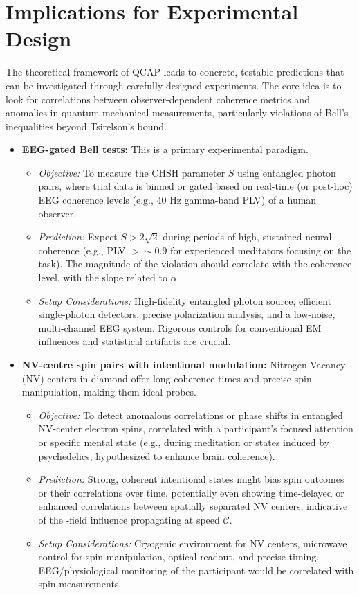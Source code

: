 \documentclass[11pt,a4paper]{article}
\newcommand{\PropSpeed}{\ensuremath{\mathscr{C}}}
\begin{document}
\section{Implications for Experimental Design}
\label{sec:experimental-design}
The theoretical framework of QCAP leads to concrete, testable predictions that can be investigated through carefully designed experiments. The core idea is to look for correlations between observer-dependent coherence metrics and anomalies in quantum mechanical measurements, particularly violations of Bell's inequalities beyond Tsirelson's bound.
\begin{itemize}
    \item \textbf{EEG-gated Bell tests:} This is a primary experimental paradigm.
    \begin{itemize}
        \item \textit{Objective:} To measure the CHSH parameter $S$ using entangled photon pairs, where trial data is binned or gated based on real-time (or post-hoc) EEG coherence levels (e.g., 40 Hz gamma-band PLV) of a human observer.
        \item \textit{Prediction:} Expect $S > 2\sqrt{2}$ during periods of high, sustained neural coherence (e.g., PLV $> \sim 0.9$ for experienced meditators focusing on the task). The magnitude of the violation should correlate with the coherence level, with the slope related to $\alpha$.
        \item \textit{Setup Considerations:} High-fidelity entangled photon source, efficient single-photon detectors, precise polarization analysis, and a low-noise, multi-channel EEG system. Rigorous controls for conventional EM influences and statistical artifacts are crucial.
    \end{itemize}

    \item \textbf{NV-centre spin pairs with intentional modulation:} Nitrogen-Vacancy (NV) centers in diamond offer long coherence times and precise spin manipulation, making them ideal probes.
    \begin{itemize}
        \item \textit{Objective:} To detect anomalous correlations or phase shifts in entangled NV-center electron spins, correlated with a participant's focused attention or specific mental state (e.g., during meditation or states induced by psychedelics, hypothesized to enhance brain coherence).
        \item \textit{Prediction:} Strong, coherent intentional states might bias spin outcomes or their correlations over time, potentially even showing time-delayed or enhanced correlations between spatially separated NV centers, indicative of the \PsiFieldField-field influence propagating at speed \PropSpeed.
        \item \textit{Setup Considerations:} Cryogenic environment for NV centers, microwave control for spin manipulation, optical readout, and precise timing. EEG/physiological monitoring of the participant would be correlated with spin measurements.
    \end{itemize}


\end{itemize}
\end{document}
